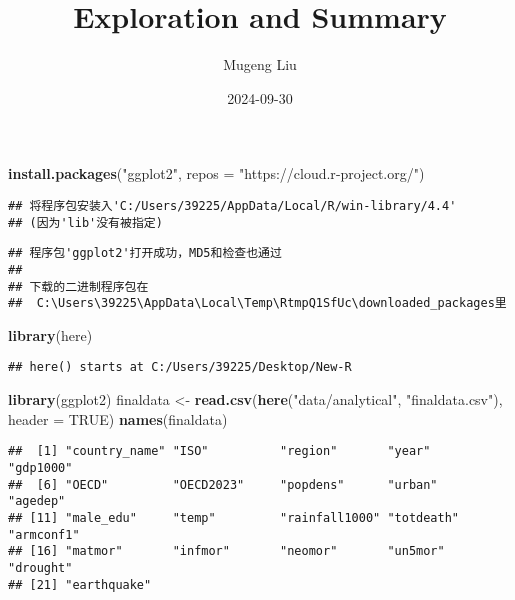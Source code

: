 \documentclass[
]{article}
\title{Exploration and Summary}
\author{Mugeng Liu}
\date{2024-09-30}
\newenvironment{Shaded}{\begin{snugshade}}{\end{snugshade}}
\newcommand{\AttributeTok}[1]{\textcolor[rgb]{0.13,0.29,0.53}{#1}}
\newcommand{\ConstantTok}[1]{\textcolor[rgb]{0.56,0.35,0.01}{#1}}
\newcommand{\FunctionTok}[1]{\textcolor[rgb]{0.13,0.29,0.53}{\textbf{#1}}}
\newcommand{\NormalTok}[1]{#1}
\newcommand{\OtherTok}[1]{\textcolor[rgb]{0.56,0.35,0.01}{#1}}
\newcommand{\StringTok}[1]{\textcolor[rgb]{0.31,0.60,0.02}{#1}}
\begin{document}
\maketitle

\begin{Shaded}
\begin{Highlighting}[]
\FunctionTok{install.packages}\NormalTok{(}\StringTok{"ggplot2"}\NormalTok{, }\AttributeTok{repos =} \StringTok{"https://cloud.r{-}project.org/"}\NormalTok{)}
\end{Highlighting}
\end{Shaded}

\begin{verbatim}
## 将程序包安装入'C:/Users/39225/AppData/Local/R/win-library/4.4'
## (因为'lib'没有被指定)
\end{verbatim}

\begin{verbatim}
## 程序包'ggplot2'打开成功，MD5和检查也通过
## 
## 下载的二进制程序包在
##  C:\Users\39225\AppData\Local\Temp\RtmpQ1SfUc\downloaded_packages里
\end{verbatim}

\begin{Shaded}
\begin{Highlighting}[]
\FunctionTok{library}\NormalTok{(here)}
\end{Highlighting}
\end{Shaded}

\begin{verbatim}
## here() starts at C:/Users/39225/Desktop/New-R
\end{verbatim}

\begin{Shaded}
\begin{Highlighting}[]
\FunctionTok{library}\NormalTok{(ggplot2)}
\NormalTok{finaldata }\OtherTok{\textless{}{-}} \FunctionTok{read.csv}\NormalTok{(}\FunctionTok{here}\NormalTok{(}\StringTok{"data/analytical"}\NormalTok{, }\StringTok{"finaldata.csv"}\NormalTok{), }\AttributeTok{header =} \ConstantTok{TRUE}\NormalTok{)}
\FunctionTok{names}\NormalTok{(finaldata)}
\end{Highlighting}
\end{Shaded}

\begin{verbatim}
##  [1] "country_name" "ISO"          "region"       "year"         "gdp1000"     
##  [6] "OECD"         "OECD2023"     "popdens"      "urban"        "agedep"      
## [11] "male_edu"     "temp"         "rainfall1000" "totdeath"     "armconf1"    
## [16] "matmor"       "infmor"       "neomor"       "un5mor"       "drought"     
## [21] "earthquake"
\end{verbatim}
\end{document}
